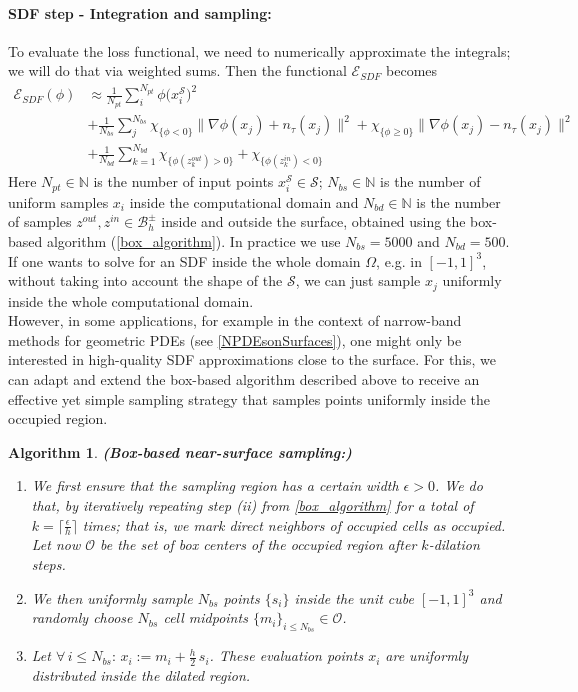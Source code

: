 \documentclass[12pt,openany]{book}
\def\S{\mathcal{S}}
\theoremstyle{plainnormal}
\newtheorem{algorithm}[theorem]{Algorithm}
\theoremstyle{remark}
\begin{document}
\paragraph{SDF step - Integration and sampling:} To evaluate the loss functional, we need to numerically approximate the integrals; we will do that via weighted sums. Then the functional $\mathcal{E}_{SDF}$ becomes
\begin{align*}
    \mathcal{E}_{SDF}(\phi) &\approx 
 \frac{1}{N_{pt}}\sum_i^{N_{pt}}\phi\big( x_i^\S\big)^2\\ &+ \frac{1}{N_{bs}}\sum_j^{N_{bs}}
\chi_{\{\phi < 0\}} \|\nabla \phi(x_j) + n_\tau(x_j)\|^2 + \chi_{\{\phi \geq 0\}} \|\nabla \phi(x_j) - n_\tau(x_j)\|^2  \\&+\frac{1}{N_{bd}} \sum^{N_{bd}}_{k = 1}\chi_{\{\phi(z^{out}_k) > 0\}} + \chi_{\{\phi(z^{in}_k) < 0\}}
\end{align*}
Here $N_{pt}\in \mathbb{N}$ is the number of input points $x_i^\S \in \mathcal S$;  $N_{bs}\in \mathbb{N}$ is the number of uniform samples $x_i$ inside the computational domain and $N_{bd}\in \mathbb{N}$ is the number of samples $z^{out}, z^{in} \in \mathcal{B}_h^\pm$ inside and outside the surface, obtained using the box-based algorithm (\cref{box_algorithm}). In practice we use $N_{bs} = 5000$ and $N_{bd} = 500$.\\
If one wants to solve for an SDF inside the whole domain $\Omega$, e.g. in $[-1,1]^3$, without taking into account the shape of the $\S$, we can just sample $x_j$ uniformly inside the whole computational domain.\\
However, in some applications, for example in the context of narrow-band methods for geometric PDEs (see \cref{NPDEsonSurfaces}), one might only be interested in high-quality SDF approximations close to the surface. For this, we can adapt and extend the box-based algorithm described above to receive an effective yet simple sampling strategy that samples points uniformly inside the occupied region.
\begin{algorithm}\label{clever_sampling}\textbf{(Box-based near-surface sampling:)}
  \begin{enumerate}
      \item We first ensure that the sampling region has a certain width $\epsilon > 0$. We do that, by iteratively repeating step (ii) from \cref{box_algorithm} for a total of $k = \lceil \frac{\epsilon}{h} \rceil$ times; that is, we mark direct neighbors of occupied cells as occupied. Let now $\mathcal{O}$ be the set of box centers of the occupied region after $k$-dilation steps. 
      \item We then uniformly sample $N_{bs}$ points $\{s_i\}$ inside the unit cube $[-1,1]^3$ and randomly choose $N_{bs}$ cell midpoints $\{m_i\}_{i \leq N_{bs}} \in \mathcal O$.
      \item Let $\forall\, i \leq N_{bs}: \,x_i := m_i + \frac{h}{2}\,s_i$. These evaluation points $x_i$ are uniformly distributed inside the dilated region.
  \end{enumerate}  
\end{algorithm}
\end{document}
